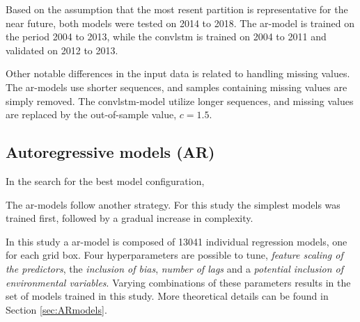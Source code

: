 Based on the assumption that the most resent partition is representative for the near future, both models were tested on 2014 to 2018. The \acrshort{ar}-model is trained on the period 2004 to 2013, while the \acrshort{convlstm} is trained on  2004 to 2011 and validated on 2012 to 2013.

Other notable differences in the input data is related to handling missing values.  
The \acrshort{ar}-models use shorter sequences, and samples containing missing values are simply removed. The \acrshort{convlstm}-model utilize longer sequences, and missing values are replaced by the out-of-sample value, $c=1.5$. 

\subsection{Autoregressive models (AR)}
In the search for the best model configuration, 

The \acrshort{ar}-models follow another strategy. For this study the simplest models was trained first, followed by a gradual increase in complexity.

In this study a \acrshort{ar}-model is composed of 13041 individual regression models, one for each grid box. Four hyperparameters are possible to tune, \textit{feature scaling of the predictors}, the \textit{inclusion of bias}, \textit{number of lags} and a \textit{potential inclusion of environmental variables}. Varying combinations of these parameters results in the set of models trained in this study. More theoretical details can be found in Section \ref{sec:ARmodels}. 


